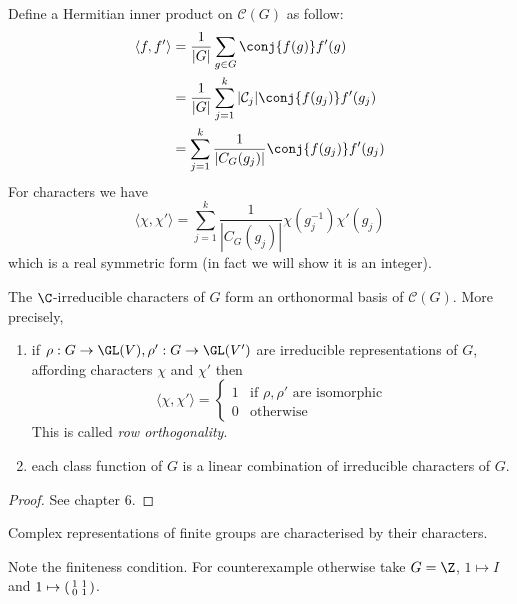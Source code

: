 \documentclass[a4paper]{article}
\theoremstyle{definition}
\begin{document}
Define a Hermitian inner product on \(\mathcal C(G)\) as follow:
\begin{align*}
  \langle f, f' \rangle
  &= \frac{1}{|G|} \sum_{g \in G} \conj{f(g)} f'(g) \\
  &= \frac{1}{|G|} \sum_{j = 1}^k |\mathcal C_j| \conj{f(g_j)} f'(g_j) \\
  &= \sum_{j = 1}^k \frac{1}{|C_G(g_j)|} \conj{f(g_j)} f'(g_j)
\end{align*}
For characters we have
\[
  \langle \chi, \chi' \rangle
  = \sum_{j = 1}^k \frac{1}{|C_G(g_j)|} \chi(g_j^{-1}) \chi'(g_j)
\]
which is a real symmetric form (in fact we will show it is an integer).

\begin{theorem}
  \label{thm:completeness of character}
  The \(\C\)-irreducible characters of \(G\) form an orthonormal basis of \(\mathcal C(G)\). More precisely,
  \begin{enumerate}
  \item if \(\rho: G \to \GL(V), \rho': G \to \GL(V')\) are irreducible representations of \(G\), affording characters \(\chi\) and \(\chi'\) then
    \[
      \langle \chi, \chi' \rangle =
      \begin{cases}
        1 & \text{if \(\rho, \rho'\) are isomorphic} \\
        0 & \text{otherwise}
      \end{cases}
    \]
    This is called \emph{row orthogonality}.
  \item each class function of \(G\) is a linear combination of irreducible characters of \(G\).
  \end{enumerate}
\end{theorem}

\begin{proof}
  See chapter 6.
\end{proof}

\begin{corollary}
  Complex representations of finite groups are characterised by their characters.
\end{corollary}

Note the finiteness condition. For counterexample otherwise take \(G = \Z\), \(1 \mapsto I\) and \(1 \mapsto
\begin{psmallmatrix}
  1 & 1 \\
  0 & 1
\end{psmallmatrix}
\).
\end{document}
